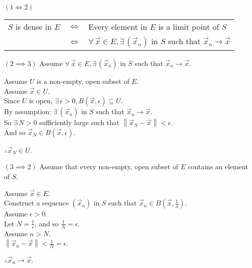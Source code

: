 \documentclass[letterpaper,12pt,fleqn]{article}
\newcommand{\vx}{\vec{x}}
\newcommand{\e}{\epsilon}
\newcommand{\norm}[1]{\left\|#1\right\|}
\begin{document}
\begin{theproof}
  \listbreak
  \begin{description}
  \item $(1\iff2)$

    \begin{tabular}{lcl}
    $S$ is dense in $E$ & $\iff$ &
    Every element in $E$ is a limit point of $S$ \\
    & $\iff$ & $\forall\,\vx\in E,\exists\,(\vx_n)$ in $S$ such that
    $\vx_n\to\vx$
    \end{tabular}

  \item $(2\implies3)$ Assume $\forall\,\vx\in E,\exists\,(\vx_n)$ in $S$ such
    that $\vx_n\to\vx$.

    Assume $U$ is a non-empty, open subset of $E$. \\
    Assume $\vx\in U$. \\
    Since $U$ is open, $\exists\,\e>0,B(\vx,\e)\subseteq U$. \\
    By assumption: $\exists\,(\vx_n)$ in $S$ such that $\vx_n\to\vx$. \\
    So $\exists\,N>0$ sufficiently large such that $\norm{\vx_N-\vx}<\e$. \\
    And so $\vx_N\in B(\vx,\e)$.

    $\therefore\vx_N\in U$.

  \item $(3\implies2)$ Assume that every non-empty, open subset of $E$
    contains an element of $S$.

    Assume $\vx\in E$. \\
    Construct a sequence $(\vx_n)$ in $S$ such that
    $\vx_n\in B(\vx,\frac{1}{n})$. \\
    Assume $\e>0$. \\
    Let $N=\frac{1}{\e}$, and so $\frac{1}{N}=\e$. \\
    Assume $n>N$. \\
    $\norm{\vx_n-\vx}<\frac{1}{N}=\e$.

    $\therefore\vx_n\to\vx$.
  \end{description}
\end{theproof}
\end{document}
